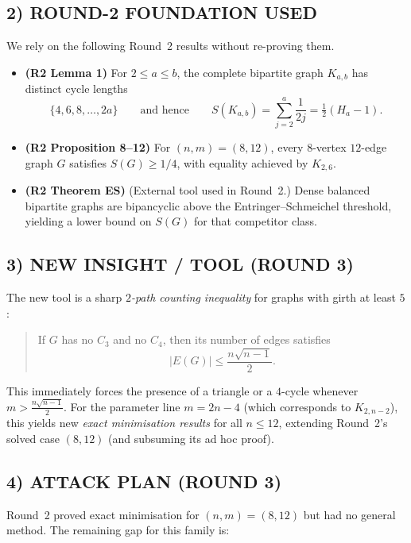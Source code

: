 \subsection{2) ROUND-2 FOUNDATION USED}

We rely on the following Round~2 results without re-proving them.

\begin{itemize}
  \item \textbf{(R2 Lemma 1)} For $2\le a\le b$, the complete bipartite graph $K_{a,b}$ has distinct cycle lengths
  \[\{4,6,8,\dots,2a\}\qquad\text{and hence}\qquad S(K_{a,b})=\sum_{j=2}^a\frac1{2j}=\tfrac12(H_a-1).\]
  \item \textbf{(R2 Proposition 8--12)} For $(n,m)=(8,12)$, every $8$-vertex $12$-edge graph $G$ satisfies $S(G)\ge 1/4$,
  with equality achieved by $K_{2,6}$.
  \item \textbf{(R2 Theorem ES)} (External tool used in Round~2.) Dense balanced bipartite graphs are bipancyclic above the
  Entringer--Schmeichel threshold, yielding a lower bound on $S(G)$ for that competitor class.
\end{itemize}

\subsection{3) NEW INSIGHT / TOOL (ROUND 3)}

The new tool is a sharp \emph{$2$-path counting inequality} for graphs with girth at least $5$:

\begin{quote}
If $G$ has no $C_3$ and no $C_4$, then its number of edges satisfies
\[|E(G)|\le \frac{n\sqrt{n-1}}{2}.\]
\end{quote}

This immediately forces the presence of a triangle or a $4$-cycle whenever
$m>\frac{n\sqrt{n-1}}{2}$.  For the parameter line $m=2n-4$ (which corresponds to $K_{2,n-2}$),
this yields new \emph{exact minimisation results} for all $n\le 12$, extending Round~2's solved case $(8,12)$
(and subsuming its ad hoc proof).

\subsection{4) ATTACK PLAN (ROUND 3)}

Round~2 proved exact minimisation for $(n,m)=(8,12)$ but had no general method.
The remaining gap for this family is:


